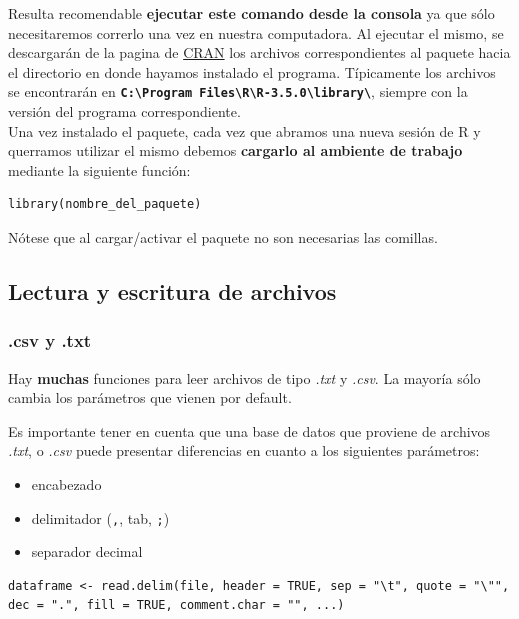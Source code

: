 \documentclass[]{book}
\providecommand{\tightlist}{%
  \setlength{\itemsep}{0pt}\setlength{\parskip}{0pt}}
\begin{document}
Resulta recomendable \textbf{ejecutar este comando desde la consola} ya que sólo necesitaremos correrlo una vez en nuestra computadora. Al ejecutar el mismo, se descargarán de la pagina de \href{www.cran.r-project.org}{CRAN} los archivos correspondientes al paquete hacia el directorio en donde hayamos instalado el programa. Típicamente los archivos se encontrarán en \textbf{\texttt{C:\textbackslash{}Program\ Files\textbackslash{}R\textbackslash{}R-3.5.0\textbackslash{}library\textbackslash{}}}, siempre con la versión del programa correspondiente.\\
Una vez instalado el paquete, cada vez que abramos una nueva sesión de R y querramos utilizar el mismo debemos \textbf{cargarlo al ambiente de trabajo} mediante la siguiente función:

\begin{verbatim}
library(nombre_del_paquete)
\end{verbatim}

Nótese que al cargar/activar el paquete no son necesarias las comillas.

\hypertarget{lectura-y-escritura-de-archivos}{%
\subsection{Lectura y escritura de archivos}\label{lectura-y-escritura-de-archivos}}

\hypertarget{csv-y-.txt}{%
\subsubsection{.csv y .txt}\label{csv-y-.txt}}

Hay \textbf{muchas} funciones para leer archivos de tipo \emph{.txt} y \emph{.csv}. La mayoría sólo cambia los parámetros que vienen por default.

Es importante tener en cuenta que una base de datos que proviene de archivos \emph{.txt}, o \emph{.csv} puede presentar diferencias en cuanto a los siguientes parámetros:

\begin{itemize}
\tightlist
\item
  encabezado
\item
  delimitador (\texttt{,}, tab, \texttt{;})
\item
  separador decimal
\end{itemize}

\begin{verbatim}
dataframe <- read.delim(file, header = TRUE, sep = "\t", quote = "\"", dec = ".", fill = TRUE, comment.char = "", ...) 
\end{verbatim}
\end{document}
